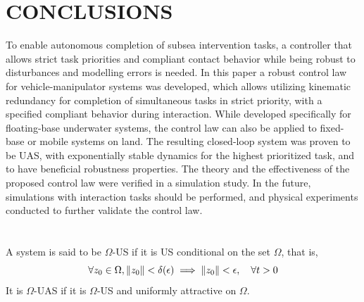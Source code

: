 \documentclass[../main.tex]{subfiles}
\begin{document}
\section{CONCLUSIONS}
\label{sec:CCTA:conclusions}
To enable autonomous completion of subsea intervention tasks, a controller that allows strict task priorities and compliant contact behavior while being robust to disturbances and modelling errors is needed. In this paper a robust control law for vehicle-manipulator systems was developed, which allows utilizing kinematic redundancy for completion of simultaneous tasks in strict priority, with a specified compliant behavior during interaction. While developed specifically for floating-base underwater systems, the control law can also be applied to fixed-base or mobile systems on land. The resulting closed-loop system was proven to be UAS, with exponentially stable dynamics for the highest prioritized task, and to have beneficial robustness properties. The theory and the effectiveness of the proposed control law were verified in a simulation study. In the future, simulations with interaction tasks should be performed, and physical experiments conducted to further validate the control law.

\section{}
\label{sec:appendix}

\setcounter{theorem}{0}
\setcounter{equation}{0}
\setcounter{definition}{0}

\renewcommand{\thetheorem}{A.\arabic{theorem}}
\renewcommand{\theequation}{A.\arabic{equation}}
\renewcommand{\thedefinition}{A.\arabic{definition}}

\begin{definition}
    \label{def:omega_uas}
    A system is said to be $\Omega$-US if it is US conditional on the set $\Omega$, that is,
    \begin{equation}
        \label{eq:omega_us}
        \forall z_0 \in \Omega, \left\lVert z_0\right\rVert < \delta(\epsilon) \implies \left\lVert z_0\right\rVert < \epsilon, \quad \forall t > 0
    \end{equation}
    It is $\Omega$-UAS if it is $\Omega$-US and uniformly attractive on $\Omega$.
\end{definition}
\end{document}
